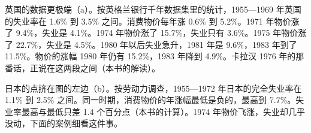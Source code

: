 英国的数据更极端（a）。按英格兰银行千年数据集里的统计，1955—1969 年英国的失业率在 1.6\% 到 3.5\% 之间\cite{boe2017}。消费物价每年涨 0.6\% 到 5.2\%\cite{boe2017}。1971 年物价涨了 9.4\%，失业是 4.1\%\cite{boe2017}。1974 年物价涨了 15.7\%，失业只有 3.6\%\cite{boe2017}。1975 年物价涨了 22.7\%，失业是 4.5\%\cite{boe2017}。1980 年以后失业急升，1981 年是 9.6\%，1983 年到了 11.5\%\cite{boe2017}。物价的涨幅 1980 年仍有 15.2\%，1983 年降到 4.9\%\cite{boe2017}。卡拉汉 1976 年的那番话，正说在这两段之间（本书的解读）。


日本的点挤在图的左边（b）。按劳动力调查，1955—1972 年日本的完全失业率在 1.1\% 到 2.5\% 之间\cite{estatlfs}。同一时期，消费物价的年涨幅最低是负的，最高到 7.7\%\cite{estatcpi}。失业率最高与最低只差 1.4 个百分点（本书的计算）。1974 年物价飞涨，失业却几乎没动，下面的案例细看这件事。

